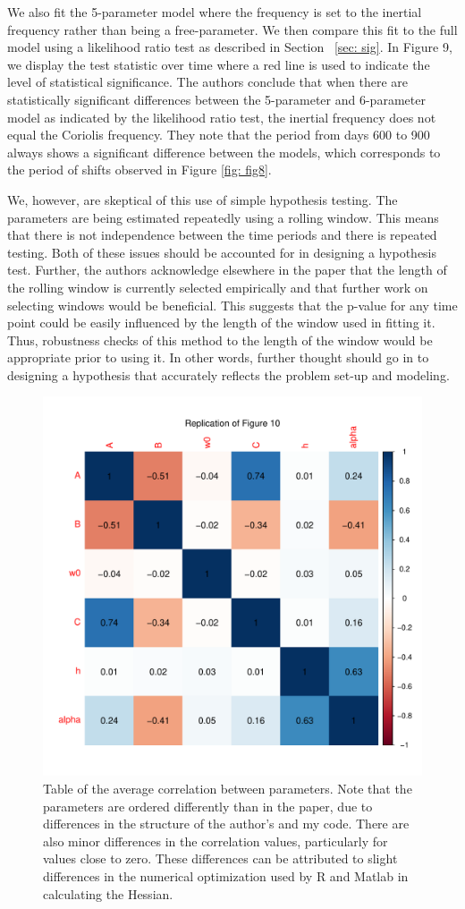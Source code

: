\documentclass{stat572Style}
\begin{document}
   
   

\par We also fit the 5-parameter model where the frequency is set to the inertial frequency rather than being a free-parameter. 
We then compare this fit to the full model using a likelihood ratio test as described in Section ~\ref{sec: sig}.
 In Figure 9, we display the test statistic over time where a red line is used to indicate the level of statistical significance. 
The authors conclude that when there are statistically significant differences between the 5-parameter and 6-parameter model as indicated by the likelihood ratio test,   the inertial frequency does not equal the Coriolis frequency.   
They note that the period from days 600 to 900 always shows a significant difference between the models, which corresponds to the period of shifts observed in Figure \ref{fig: fig8}.

\par We, however, are skeptical of this use of simple hypothesis testing. 
The parameters are being estimated repeatedly using a rolling window. 
This means that there is not independence between the time periods and there is repeated testing. 
Both of these issues should be accounted for in designing a hypothesis test. 
Further, the authors acknowledge elsewhere in the paper that the length of the rolling window is currently selected empirically and that further work on selecting windows would be beneficial. 
This suggests that the p-value for any time point could be easily influenced by the length of the window used in fitting it.
Thus, robustness checks of this method to the length of the window would be appropriate prior to using it.
In other words, further thought should go in to designing a hypothesis that accurately reflects the problem set-up and modeling. 




 \begin{figure}[h!]
  \centering
    \includegraphics[width=.6\textwidth]{ReplicatedFigures/fig10.pdf}
        \caption{Table of the average correlation between parameters. Note that the parameters are ordered differently than in the paper, due to differences in the structure of the author's and my code. There are also minor differences in the correlation values, particularly for values close to zero. These differences can be attributed to slight differences in the numerical optimization used by R and Matlab in calculating the Hessian. }
        	\label{fig: fig10}
\end{figure}
\end{document}
